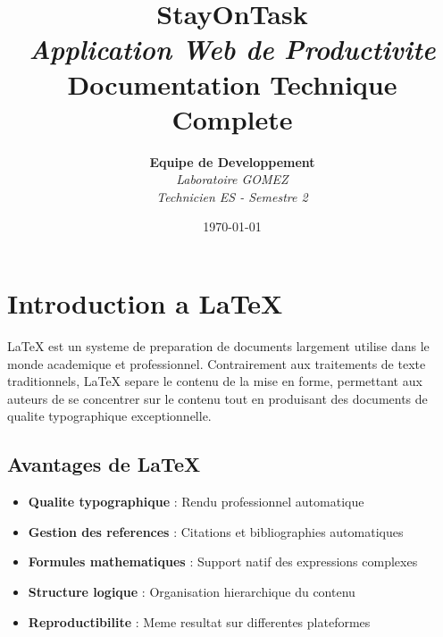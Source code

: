 \documentclass[12pt,a4paper]{article}
\title{
    \vspace{-2cm}
    \Huge\textbf{\textcolor{primarycolor}{StayOnTask}} \\
    \vspace{1cm}
    \Large\textit{Application Web de Productivite} \\
    \vspace{0.5cm}
    \large Documentation Technique Complete
    \vspace{1cm}
}
\author{
    \textbf{Equipe de Developpement} \\
    \textit{Laboratoire GOMEZ} \\
    \textit{Technicien ES - Semestre 2}
}
\date{\today}
\begin{document}
\maketitle
\thispagestyle{empty}

\vspace{2cm}

\begin{center}
\end{center}

\newpage

\tableofcontents

\newpage

\section{Introduction a LaTeX}

LaTeX est un systeme de preparation de documents largement utilise dans le monde academique et professionnel. Contrairement aux traitements de texte traditionnels, LaTeX separe le contenu de la mise en forme, permettant aux auteurs de se concentrer sur le contenu tout en produisant des documents de qualite typographique exceptionnelle.

\subsection{Avantages de LaTeX}

\begin{itemize}
    \item \textbf{Qualite typographique} : Rendu professionnel automatique
    \item \textbf{Gestion des references} : Citations et bibliographies automatiques
    \item \textbf{Formules mathematiques} : Support natif des expressions complexes
    \item \textbf{Structure logique} : Organisation hierarchique du contenu
    \item \textbf{Reproductibilite} : Meme resultat sur differentes plateformes
\end{itemize}
\end{document}
